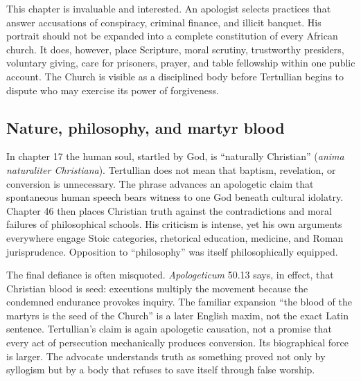 This chapter is invaluable and interested. An apologist selects practices that
answer accusations of conspiracy, criminal finance, and illicit banquet. His
portrait should not be expanded into a complete constitution of every African
church. It does, however, place Scripture, moral scrutiny, trustworthy
presiders, voluntary giving, care for prisoners, prayer, and table fellowship
within one public account. The Church is visible as a disciplined body before
Tertullian begins to dispute who may exercise its power of forgiveness.

\subsection{Nature, philosophy, and martyr blood}

In chapter 17 the human soul, startled by God, is ``naturally Christian''
(\emph{anima naturaliter Christiana}). Tertullian does not mean that baptism,
revelation, or conversion is unnecessary. The phrase advances an apologetic
claim that spontaneous human speech bears witness to one God beneath cultural
idolatry. Chapter 46 then places Christian truth against the contradictions and
moral failures of philosophical schools. His criticism is intense, yet his own
arguments everywhere engage Stoic categories, rhetorical education, medicine,
and Roman jurisprudence. Opposition to ``philosophy'' was itself philosophically
equipped.

The final defiance is often misquoted. \emph{Apologeticum} 50.13 says, in
effect, that Christian blood is seed: executions multiply the movement because
the condemned endurance provokes inquiry. The familiar expansion ``the blood
of the martyrs is the seed of the Church'' is a later English maxim, not the
exact Latin sentence. Tertullian's claim is again apologetic causation, not a
promise that every act of persecution mechanically produces conversion. Its
biographical force is larger. The advocate understands truth as something
proved not only by syllogism but by a body that refuses to save itself through
false worship.

